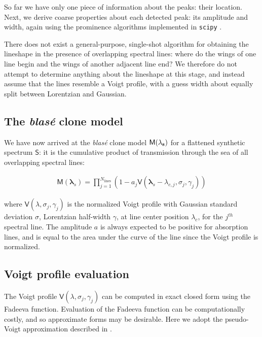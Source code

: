 \documentclass[modern]{aastex631}
\begin{document}
So far we have only one piece of information about the peaks: their location.  Next, we derive coarse properties about each detected peak: its amplitude and width, again using the prominence algorithms implemented in \texttt{scipy} \citep{2020SciPy-NMeth}.

There does not exist a general-purpose, single-shot algorithm for obtaining the lineshape in the presence of overlapping spectral lines: where do the wings of one line begin and the wings of another adjacent line end?  We therefore do not attempt to determine anything about the lineshape at this stage, and instead assume that the lines resemble a Voigt profile, with a guess width about equally split between Lorentzian and Gaussian.

\subsection{The \emph{blas\'e} clone model}

We have now arrived at the \emph{blas\'e} clone model $\mathsf{M}(\bf{\lambda}_s)$ for a flattened synthetic spectrum $\mathsf{S}$: it is the cumulative product of transmission through the sea of all overlapping spectral lines:

\begin{eqnarray}
  \mathsf{M}(\bm{\lambda}_s) = {\displaystyle \prod_{j=1}^{N_{\mathrm{lines}}}  (1-a_j \mathsf{V}(\bm{\lambda}_s-\lambda_{c,j}, \sigma_j, \gamma_j) )} \label{equation1}
\end{eqnarray}

where $\mathsf{V}(\lambda, \sigma_j, \gamma_j)$ is the normalized Voigt profile with Gaussian standard deviation $\sigma$, Lorentzian half-width $\gamma$, at line center position $\lambda_c$, for the $j^{th}$ spectral line.  The amplitude $a$ is always expected to be positive for absorption lines, and is equal to the area under the curve of the line since the Voigt profile is normalized.

\subsection{Voigt profile evaluation}
The Voigt profile $\mathsf{V}(\lambda, \sigma_j, \gamma_j)$ can be computed in exact closed form using the Fadeeva function.  Evaluation of the Fadeeva function can be computationally costly, and so approximate forms may be desirable.  Here we adopt the pseudo-Voigt approximation described in .
\end{document}
